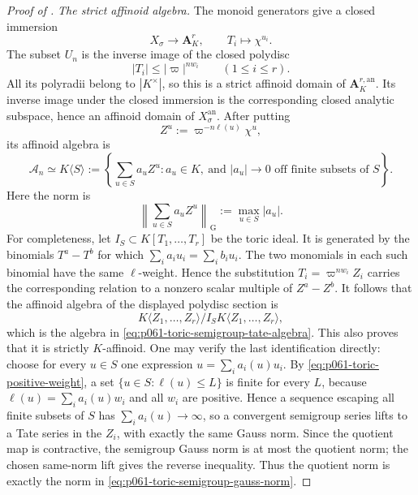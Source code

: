 \begin{proof}[Proof of ]
\smallskip
\noindent
\emph{The strict affinoid algebra.}
The monoid generators give a closed immersion
\[
 X_{\sigma}\longrightarrow\mathbf A^r_K,
 \qquad T_i\longmapsto\chi^{u_i}.
\]
The subset \(U_n\) is the inverse image of the closed polydisc
\[
          |T_i|\leq |\varpi|^{nw_i}\qquad(1\leq i\leq r).
\]
All its polyradii belong to \(|K^\times|\), so this is a strict affinoid
domain of \(\mathbf A_K^{r,\mathrm{an}}\).  Its inverse image under the
closed immersion is the corresponding closed analytic subspace, hence an
affinoid domain of \(X_{\sigma}^{\mathrm{an}}\).
After putting
\begin{equation}
\label{eq:p061-toric-rescaled-monomial}
        Z^u:=\varpi^{-n\ell(u)}\chi^u,
\end{equation}
its affinoid algebra is
\begin{equation}
\label{eq:p061-toric-semigroup-tate-algebra}
 \mathscr A_n\simeq K\langle S\rangle
 :=\left\{\sum_{u\in S}a_uZ^u:
       a_u\in K,\ \text{and }|a_u|\longrightarrow0
       \text{ off finite subsets of }S\right\}.
\end{equation}
Here the norm is
\begin{equation}
\label{eq:p061-toric-semigroup-gauss-norm}
       \left\|\sum_{u\in S}a_uZ^u\right\|_{\mathrm G}
                 :=\max_{u\in S}|a_u|.
\end{equation}
For completeness, let \(I_S\subset K[T_1,\ldots,T_r]\) be the toric
ideal.  It is generated by the binomials \(T^a-T^b\) for which
\(\sum_i a_i u_i=\sum_i b_i u_i\).  The two monomials in each such
binomial have the same \(\ell\)-weight.  Hence the substitution
\(T_i=\varpi^{nw_i}Z_i\) carries the corresponding relation to a nonzero
scalar multiple of \(Z^a-Z^b\).  It follows that the affinoid algebra of
the displayed polydisc section is
\[
 K\langle Z_1,\ldots,Z_r\rangle/I_SK\langle Z_1,\ldots,Z_r\rangle,
\]
which is the algebra in \eqref{eq:p061-toric-semigroup-tate-algebra}.
This also proves that it is strictly \(K\)-affinoid.  One may verify the
last identification directly: choose for every \(u\in S\) one expression
\(u=\sum_i a_i(u)u_i\).  By \eqref{eq:p061-toric-positive-weight}, a
set \(\{u\in S:\ell(u)\leq L\}\) is finite for every \(L\), because
\(\ell(u)=\sum_i a_i(u)w_i\) and all \(w_i\) are positive.  Hence a
sequence escaping all finite subsets of \(S\) has
\(\sum_i a_i(u)\to\infty\), so a convergent semigroup series lifts to a
Tate series in the \(Z_i\), with exactly the same Gauss norm.  Since the
quotient map is contractive, the semigroup Gauss norm is at most the
quotient norm; the chosen same-norm lift gives the reverse inequality.
Thus the quotient norm is exactly the norm in
\eqref{eq:p061-toric-semigroup-gauss-norm}.


\end{proof}

